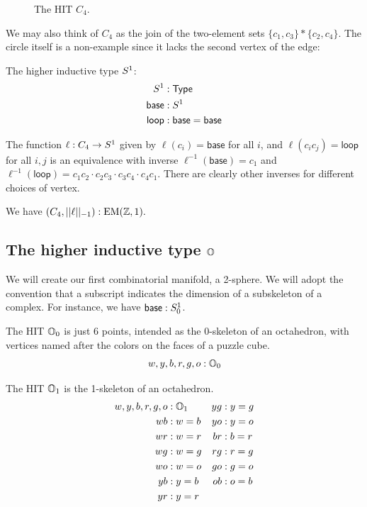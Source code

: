 \begin{figure}[htbp]
\centering

\caption{The HIT \( C_4 \).}
\end{figure}

We may also think of \( C_4 \) as the join of the two-element sets \( \{c_1, c_3\}* \{c_2, c_4\} \). The circle itself is a non-example since it lacks the second vertex of the edge:

\begin{mydef}
The higher inductive type \( S^1 \):
\begin{align*}
S^1 &:\mathsf{Type} \\
\mathsf{base}&:S^1 \\
\mathsf{loop}&:\mathsf{base}=\mathsf{base}
\end{align*}
\end{mydef}

\begin{mylemma}
The function \( \ell:C_4\to S^1 \) given by \( \ell(c_i)=\mathsf{base} \) for all \( i \), and \( \ell(c_ic_j)=\mathsf{loop} \) for all \( i,j \) is an equivalence with inverse \( \ell^{-1}(\mathsf{base})=c_1 \) and \( \ell^{-1}(\mathsf{loop})=c_1c_2\cdot c_2c_3\cdot c_3c_4\cdot c_4c_1 \). There are clearly other inverses for different choices of vertex.
\end{mylemma}

\begin{mycor}
We have \( (C_4,||\ell||_{-1}):\mathrm{EM}(\mathbb{Z},1). \)
\end{mycor}

\subsection{\texorpdfstring{The higher inductive type \( \mathbb{O} \)}{The higher inductive type O}}

We will create our first combinatorial manifold, a 2-sphere. We will adopt the convention that a subscript indicates the dimension of a subskeleton of a complex. For instance, we have \( \mathsf{base}:S^1_0 \).

\begin{mydef}
The HIT \( \mathbb{O}_0 \) is just 6 points, intended as the 0-skeleton of an octahedron, with vertices named after the colors on the faces of a puzzle cube.
\[ w, y, b, r, g, o : \mathbb{O}_0 \]
\end{mydef}

\begin{mydef}
The HIT \( \mathbb{O}_1 \) is the 1-skeleton of an octahedron.
\begin{align*}
w, y, b, r, g, o &: \mathbb{O}_1 & yg &: y=g \\
wb &: w=b & yo &: y=o \\
wr &: w=r & br &: b=r \\
wg &: w=g & rg &: r=g \\
wo &: w=o & go &: g=o \\
yb &: y=b & ob &: o=b \\
yr &: y=r
\end{align*}
\end{mydef}

